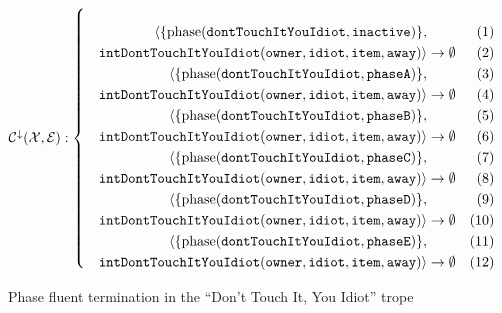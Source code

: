 \documentclass[11pt]{report}
\begin{document}
\begin{figure}[!ht]
\abovedisplayskip=0pt
\abovedisplayshortskip=0pt
$\mathcal{C^{\downarrow} (X, E)}:\left\{\mbox{%
\begin{minipage}[c]{0.85\textwidth}
\begin{align}
  \langle \{\text{phase}(\mathtt{dontTouchItYouIdiot, inactive})\},\nonumber\\
  \mathtt{intDontTouchItYouIdiot(owner, idiot, item, away)} \rangle %
&\rightarrow \emptyset\label{eq:phase-inactive-term-full}\\
  \langle \{\text{phase}(\mathtt{dontTouchItYouIdiot, phaseA})\}, \nonumber\\
  \mathtt{intDontTouchItYouIdiot(owner, idiot, item, away)} \rangle %
&\rightarrow \emptyset\label{eq:phase-a-term-full}\\
  \langle \{\text{phase}(\mathtt{dontTouchItYouIdiot, phaseB})\}, \nonumber\\
  \mathtt{intDontTouchItYouIdiot(owner, idiot, item, away)} \rangle %
&\rightarrow \emptyset\label{eq:phase-b-term-full}\\
  \langle \{\text{phase}(\mathtt{dontTouchItYouIdiot, phaseC})\}, \nonumber\\
  \mathtt{intDontTouchItYouIdiot(owner, idiot, item, away)} \rangle %
&\rightarrow \emptyset\label{eq:phase-c-term-full}\\
  \langle \{\text{phase}(\mathtt{dontTouchItYouIdiot, phaseD})\}, \nonumber\\
  \mathtt{intDontTouchItYouIdiot(owner, idiot, item, away)} \rangle %
&\rightarrow \emptyset\label{eq:phase-d-term-full}\\
  \langle\{\text{phase}(\mathtt{dontTouchItYouIdiot, phaseE})\},
  \nonumber\\\mathtt{intDontTouchItYouIdiot(owner, idiot, item, away)} \rangle %
&\rightarrow \emptyset\label{eq:phase-done-term-full}
\end{align}
\end{minipage}}\right.$
\caption{Phase fluent termination in the ``Don't Touch It, You Idiot'' trope} \label{fig:pj-phase-terms-full}
\end{figure}


\end{document}
